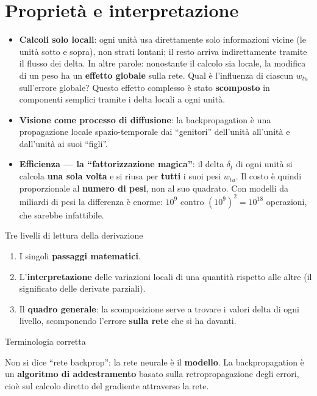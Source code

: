\section{Proprietà e
interpretazione}\label{proprietuxe0-e-interpretazione}

\begin{itemize}
\tightlist
\item
  \textbf{Calcoli solo locali}: ogni unità usa direttamente solo
  informazioni vicine (le unità sotto e sopra), non strati lontani; il
  resto arriva indirettamente tramite il flusso dei delta. In altre
  parole: nonostante il calcolo sia locale, la modifica di un peso ha un
  \textbf{effetto globale} sulla rete. Qual è l'influenza di ciascun
  \(w_{tu}\) sull'errore globale? Questo effetto complesso è stato
  \textbf{scomposto} in componenti semplici tramite i delta locali a
  ogni unità.
\item
  \textbf{Visione come processo di diffusione}: la backpropagation è una
  propagazione locale spazio-temporale dai ``genitori'' dell'unità
  all'unità e dall'unità ai suoi ``figli''.
\item
  \textbf{Efficienza --- la ``fattorizzazione magica''}: il delta
  \(\delta_t\) di ogni unità si calcola \textbf{una sola volta} e si
  riusa per \textbf{tutti} i suoi pesi \(w_{tu}\). Il costo è quindi
  proporzionale al \textbf{numero di pesi}, non al suo quadrato. Con
  modelli da miliardi di pesi la differenza è enorme: \(10^9\) contro
  \((10^9)^2 = 10^{18}\) operazioni, che sarebbe infattibile.
\end{itemize}

\begin{boxtip}{Tre livelli di lettura della derivazione}

\begin{enumerate}
\def\labelenumi{\arabic{enumi}.}
\tightlist
\item
  I singoli \textbf{passaggi matematici}.
\item
  L'\textbf{interpretazione} delle variazioni locali di una quantità
  rispetto alle altre (il significato delle derivate parziali).
\item
  Il \textbf{quadro generale}: la scomposizione serve a trovare i valori
  delta di ogni livello, scomponendo l'errore \textbf{sulla rete} che si
  ha davanti.
\end{enumerate}

\end{boxtip}

\begin{boxwarning}{Terminologia corretta}

Non si dice ``rete backprop'': la rete neurale è il \textbf{modello}. La
backpropagation è un \textbf{algoritmo di addestramento} basato sulla
retropropagazione degli errori, cioè sul calcolo diretto del gradiente
attraverso la rete.

\end{boxwarning}

